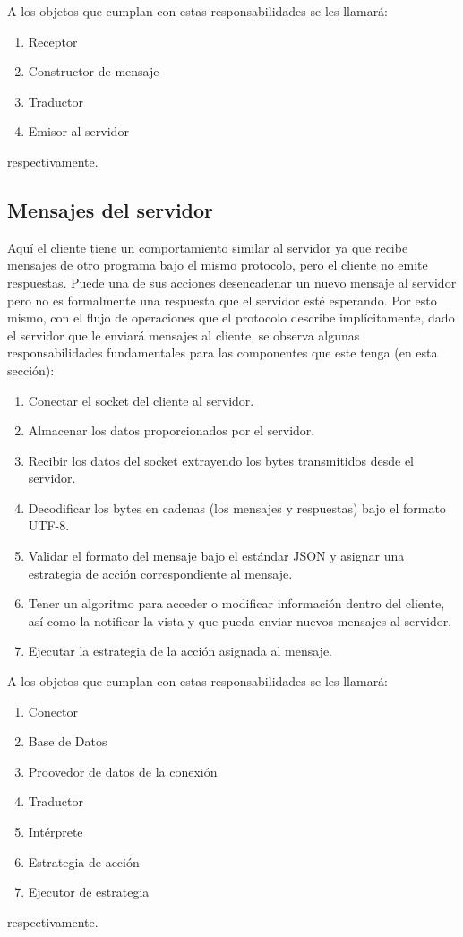 A los objetos que cumplan con estas responsabilidades se les llamará:
\begin{enumerate}
	\item Receptor
	\item Constructor de mensaje
	\item Traductor
	\item Emisor al servidor
\end{enumerate}
respectivamente.

\subsection{Mensajes del servidor}

Aquí el cliente tiene un comportamiento similar al servidor ya que recibe mensajes de otro programa bajo el mismo protocolo, pero el cliente no emite respuestas. Puede una de sus acciones desencadenar un nuevo mensaje al servidor pero no es formalmente una respuesta que el servidor esté esperando.
Por esto mismo, con el flujo de operaciones que el protocolo describe implícitamente, dado el servidor que le enviará mensajes al cliente, se observa algunas responsabilidades fundamentales para las componentes que este tenga (en esta sección):

\begin{enumerate}
	\item Conectar el socket del cliente al servidor.
	\item Almacenar los datos proporcionados por el servidor.
	\item Recibir los datos del socket extrayendo los bytes transmitidos desde el servidor.
	\item Decodificar los bytes en cadenas (los mensajes y respuestas) bajo el formato UTF-8.
	\item Validar el formato del mensaje bajo el estándar JSON y asignar una estrategia de acción correspondiente al mensaje.
	\item Tener un algoritmo para acceder o modificar información dentro del cliente, así como la notificar la vista y que pueda enviar nuevos mensajes al servidor.
	\item Ejecutar la estrategia de la acción asignada al mensaje.
\end{enumerate}

A los objetos que cumplan con estas responsabilidades se les llamará:

\begin{enumerate}
	\item Conector
	\item Base de Datos
	\item Proovedor de datos de la conexión
	\item Traductor
	\item Intérprete
	\item Estrategia de acción
	\item Ejecutor de estrategia
\end{enumerate}

respectivamente.